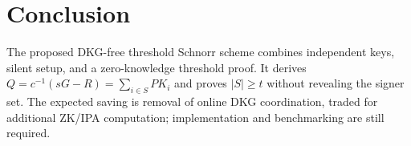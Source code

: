 \documentclass[10pt,a4paper]{article}
\begin{document}
\section{Conclusion}

The proposed DKG-free threshold Schnorr scheme combines independent keys,
silent setup, and a zero-knowledge threshold proof. It derives
$Q=c^{-1}(sG-R)=\sum_{i\in S}PK_i$ and proves $|S|\ge t$ without revealing the
signer set. The expected saving is removal of online DKG coordination, traded
for additional ZK/IPA computation; implementation and benchmarking are still
required.
\end{document}
